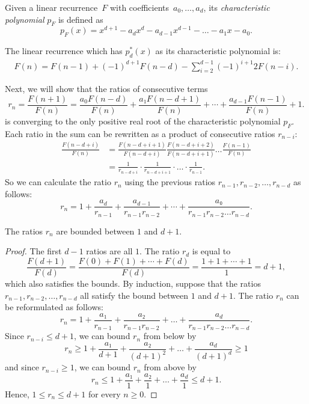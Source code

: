 \begin{definition}
  Given a linear recurrence~$F$ with coefficients~$a_0, \dots, a_d$, its
  \emph{characteristic polynomial} $p_F$ is defined as
  \[
    p_F(x) = x^{d+1} - a_d x^d - a_{d-1} x^{d-1} - \dots - a_1 x - a_0.
  \]
\end{definition}

\begin{example}
  The linear recurrence which has $p_d^*(x)$ as its characteristic polynomial is:
  \begin{align*}
    F(n) = F(n - 1) + (-1)^{d+1} F(n - d) - \sum_{i=2}^{d - 1} (-1)^{i+1} 2 F(n - i).
  \end{align*}
\end{example}

Next, we will show that the ratios of consecutive terms
\[
  r_n = \frac{F(n+1)}{F(n)} = \frac{a_0 F(n - d)}{F(n)} + \frac{a₁ F(n - d + 1)}{F(n)} + ⋯ + \frac{a_{d-1} F(n-1)}{F(n)} + 1.
\]
is converging to the only positive real root of the characteristic polynomial $p_F$.
Each ratio in the sum can be rewritten as a product of consecutive ratios $r_{n-i}$:
\begin{align*}
  \frac{F(n - d + i)}{F(n)}
  & = \frac{F(n - d + i + 1)}{F(n - d + i)} \frac{F(n - d + i + 2)}{F(n - d + i + 1)} \dots \frac{F(n-1)}{F(n)} \\
  & = \frac{1}{r_{n - d + i}} · \frac{1}{r_{n - d + i + 1}} · \dots · \frac{1}{r_{n-1}}.
\end{align*}
So we can calculate the ratio $r_n$ using the previous ratios $r_{n-1}, r_{n-2}, …, r_{n-d}$ as follows:
\[
  r_n = 1 + \frac{a_d}{r_{n-1}} + \frac{a_{d-1}}{r_{n-1} r_{n-2}} + ⋯ + \frac{a₀}{r_{n-1} r_{n-2} \dots r_{n-d}}.
\]


\begin{lemma}
  The ratios $r_n$ are bounded between $1$ and $d+1$.
\end{lemma}

\begin{proof}
  The first $d - 1$ ratios are all $1$.
  The ratio $r_d$ is equal to
  \[
    \frac{F(d+1)}{F(d)} = \frac{F(0) + F(1) + ⋯ + F(d)}{F(d)} = \frac{1 + 1 + ⋯ + 1}{1} = d + 1,
  \]
  which also satisfies the bounds.
  By induction, suppose that the ratios $r_{n-1}, r_{n-2}, …, r_{n-d}$ all satisfy the bound between $1$ and $d+1$.
  The ratio $r_n$ can be reformulated as follows:
  \[
    r_n = 1 + \frac{a₁}{r_{n-1}} + \frac{a₂}{r_{n-1} r_{n-2}} + \dots + \frac{a_d}{r_{n-1} r_{n-2} \dots r_{n-d}}.
  \]
  Since $r_{n-i} ≤ d+1$, we can bound $r_n$ from below by
  \[
    r_n ≥ 1 + \frac{a₁}{d+1} + \frac{a₂}{(d+1)^2} + \dots + \frac{a_d}{(d+1)^d} ≥ 1
  \]
  and since $r_{n-i} ≥ 1$, we can bound $r_n$ from above by
  \[
    r_n ≤ 1 + \frac{a₁}{1} + \frac{a₂}{1} + \dots + \frac{a_d}{1} ≤ d+1.
  \]
  Hence, $1 ≤ r_n ≤ d+1$ for every $n ≥ 0$.
\end{proof}

